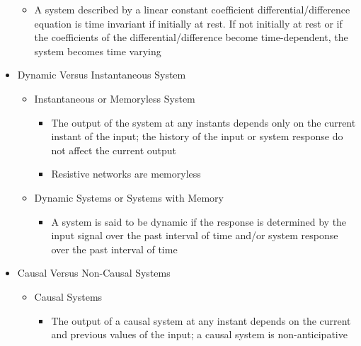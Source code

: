\begin{itemize}
\begin{itemize}
      \item A system described by a linear constant coefficient differential/difference equation is time invariant if initially at rest. If not initially at rest or if the coefficients of the differential/difference become time-dependent, the system becomes time varying

    \end{itemize}

  \item Dynamic Versus Instantaneous System

    \begin{itemize}

      \item Instantaneous or Memoryless System

        \begin{itemize}

          \item The output of the system at any instants depends only on the current instant of the input; the history of the input or system response do not affect the current output

          \item Resistive networks are memoryless

        \end{itemize}

      \item Dynamic Systems or Systems with Memory

        \begin{itemize}

          \item A system is said to be dynamic if the response is determined by the input signal over the past interval of time and/or system response over the past interval of time

        \end{itemize}

    \end{itemize}

  \item Causal Versus Non-Causal Systems

    \begin{itemize}

      \item Causal Systems

        \begin{itemize}

          \item The output of a causal system at any instant depends on the current and previous values of the input; a causal system is non-anticipative


\end{itemize}
\end{itemize}
\end{itemize}
